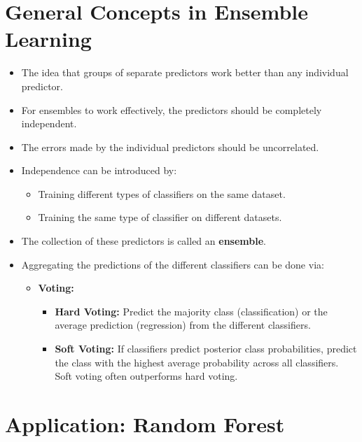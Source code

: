\documentclass[10pt]{article}
\begin{document}
\section{General Concepts in Ensemble Learning}

\begin{itemize}
    \item The idea that groups of separate predictors work better than any individual predictor.
    \item For ensembles to work effectively, the predictors should be completely independent.
    \item The errors made by the individual predictors should be uncorrelated.
    \item Independence can be introduced by:
    \begin{itemize}
        \item Training different types of classifiers on the same dataset.
        \item Training the same type of classifier on different datasets.
    \end{itemize}
    \item The collection of these predictors is called an \textbf{ensemble}.
    \item Aggregating the predictions of the different classifiers can be done via:
    \begin{itemize}
        \item \textbf{Voting:}
        \begin{itemize}
            \item \textbf{Hard Voting:} Predict the majority class (classification) or the average prediction (regression) from the different classifiers.
            \item \textbf{Soft Voting:} If classifiers predict posterior class probabilities, predict the class with the highest average probability across all classifiers. Soft voting often outperforms hard voting.
        \end{itemize}
    \end{itemize}
\end{itemize}

\section{Application: Random Forest}
\end{document}
